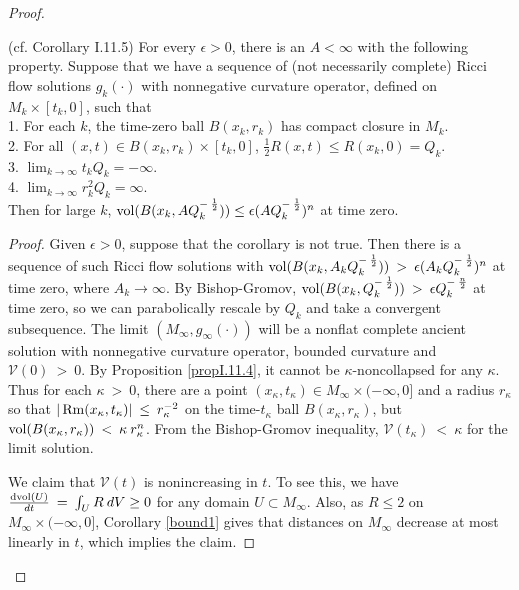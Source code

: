\begin{proof}
\begin{corollary}
  \label{cor:kl-volume-bound-existence-curvature-operators}
 (cf. Corollary I.11.5) \label{corI.11.5}
For every $\epsilon > 0$, there is an $A < \infty$ with the following
property.  Suppose that we have a sequence of (not necessarily
complete) Ricci flow solutions $g_k(\cdot)$ with nonnegative
curvature operator, defined on $M_k \times [t_k, 0]$, such that \\
1.  For each $k$, the time-zero ball $B(x_k, r_k)$ has compact closure
in $M_k$. \\
2. For all $(x, t) \in B(x_k, r_k) \times
[t_k, 0]$, $\frac12 R(x,t) \le R(x_k, 0) = Q_k$. \\
3. $\lim_{k \rightarrow \infty} t_k Q_k = - \infty$. \\
4. $\lim_{k \rightarrow \infty} r_k^2 Q_k = \infty$. \\
Then for large $k$, $\operatorname{vol}(B(x_k, A Q_k^{- \: \frac12})) \le
\epsilon (A Q_k^{- \: \frac12})^n$ at time zero.
\end{corollary}
\begin{proof}
Given $\epsilon > 0$, suppose that the corollary is not true.
Then there is a sequence of such Ricci flow solutions with
$\operatorname{vol}(B(x_k, A_k Q_k^{- \: \frac12})) \: > \: \epsilon
(A_k Q_k^{- \: \frac12})^n$ at time zero, where
 $A_k \rightarrow \infty$.
 By Bishop-Gromov, $\operatorname{vol}(B(x_k, Q_k^{- \: \frac12})) \: > \: \epsilon
Q_k^{- \: \frac{n}{2}}$ at time zero, so we can parabolically rescale by
$Q_k$ and take a convergent subsequence. The limit $(M_\infty,
g_\infty(\cdot))$ will be a nonflat complete ancient solution with
nonnegative curvature operator, bounded curvature and
 ${\mathcal V}(0) \: > \: 0$.
 By Proposition \ref{propI.11.4}, it cannot be $\kappa$-noncollapsed
 for any $\kappa$.
Thus for each $\kappa \: > \: 0$,
there are a point $(x_\kappa, t_\kappa) \in M_\infty \times (-\infty,0]$ and a radius
$r_\kappa$ so that $|\operatorname{Rm}(x_\kappa, t_\kappa)| \: \le \:
r_\kappa^{-2}$ on the time-$t_\kappa$ ball $B(x_\kappa, r_\kappa)$,
but $\operatorname{vol}(B(x_\kappa, r_\kappa)) \: < \: \kappa \:
r_\kappa^n$. From the Bishop-Gromov inequality,
${\mathcal V}(t_\kappa) \: < \: \kappa$ for the limit solution.

We claim that
${\mathcal V}(t)$ is nonincreasing in $t$. To see this, we have
$\frac{\operatorname{dvol}(U)}{dt} \: = \: \int_U R \: dV  \ge 0$ for any domain $U
\subset M_\infty$.
Also, as $R \le 2$ on $M_\infty \times (-\infty, 0]$,
Corollary \ref{bound1}
gives that distances on $M_\infty$
decrease at most linearly in $t$,
which implies the claim.


\end{proof}
\end{proof}

